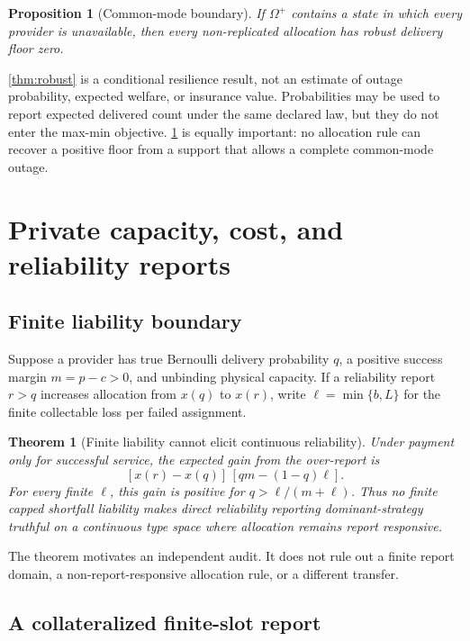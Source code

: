 \documentclass[11pt]{article}
\newtheorem{theorem}{Theorem}
\newtheorem{proposition}{Proposition}
\theoremstyle{definition}
\begin{document}
\begin{proposition}[Common-mode boundary]
\label{prop:commonmode}
If $\Omega^+$ contains a state in which every provider is unavailable, then
every non-replicated allocation has robust delivery floor zero.
\end{proposition}

\cref{thm:robust} is a conditional resilience result, not an estimate of
outage probability, expected welfare, or insurance value. Probabilities may be
used to report expected delivered count under the same declared law, but they
do not enter the max-min objective. \cref{prop:commonmode} is equally
important: no allocation rule can recover a positive floor from a support that
allows a complete common-mode outage.

\section{Private capacity, cost, and reliability reports}
\label{sec:reports}

\subsection{Finite liability boundary}

Suppose a provider has true Bernoulli delivery probability $q$, a positive
success margin $m=p-c>0$, and unbinding physical capacity. If a reliability
report $r>q$ increases allocation from $x(q)$ to $x(r)$, write
$\ell=\min\{b,L\}$ for the finite collectable loss per failed assignment.

\begin{theorem}[Finite liability cannot elicit continuous reliability]
\label{thm:liability}
Under payment only for successful service, the expected gain from the
over-report is
\[
 [x(r)-x(q)]\,[qm-(1-q)\ell].
\]
For every finite $\ell$, this gain is positive for
$q>\ell/(m+\ell)$. Thus no finite capped shortfall liability makes direct
reliability reporting dominant-strategy truthful on a continuous type space
where allocation remains report responsive.
\end{theorem}

The theorem motivates an independent audit. It does not rule out a finite
report domain, a non-report-responsive allocation rule, or a different
transfer.

\subsection{A collateralized finite-slot report}
\end{document}
